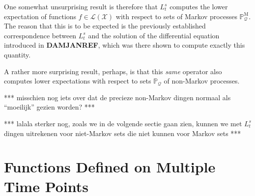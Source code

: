 \documentclass[10pt]{paper}
\theoremstyle{definition}
\newtheorem{definition}{Definition}
\newcommand{\reals}{\mathbb{R}}
\newcommand{\realsnonneg}{\reals_{\geq 0}}
\newcommand{\states}{\mathcal{X}}
\newcommand{\processes}{\mathbb{P}}
\newcommand{\mprocesses}{\processes^{\mathrm{M}}}
\newcommand{\gambles}{\mathcal{L}}
\newcommand{\gamblesX}{\gambles(\states)}
\newcommand{\rateset}{\mathcal{Q}}
\newcommand{\lrate}{\underline{Q}}
\newcommand{\coloneqq}{:\!=}
\begin{document}

One somewhat unsurprising result is therefore that $L_t^s$ computes the lower expectation of functions $f\in\gamblesX$ with respect to sets of Markov processes $\mprocesses_\rateset$. The reason that this is to be expected is the previously established correspondence between $L_t^s$ and the solution of the differential equation introduced in {\bf DAMJANREF}, which was there shown to compute exactly this quantity.

A rather more surprising result, perhaps, is that this \emph{same} operator also computes lower expectations with respect to sets $\processes_\rateset$ of non-Markov processes.

*** misschien nog iets over dat de precieze non-Markov dingen normaal als ``moeilijk'' gezien worden? ***

*** lalala sterker nog, zoals we in de volgende sectie gaan zien, kunnen we met $L_t^s$ dingen uitrekenen voor niet-Markov sets die niet kunnen voor Markov sets ***

\section{Functions Defined on Multiple Time Points}\label{sec:funcs_multi_time_points}


\end{document}
